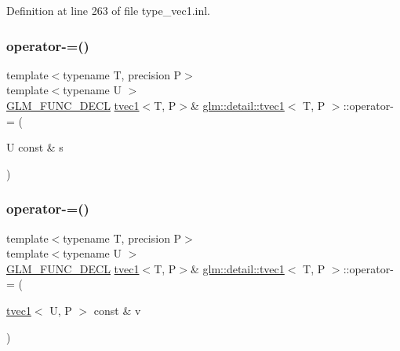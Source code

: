 Definition at line 263 of file type\+\_\+vec1.\+inl.

\mbox{\label{structglm_1_1detail_1_1tvec1_affba0ab0b93fbaa98d843c89433606f3}} 
\subsubsection{\texorpdfstring{operator-\/=()}{operator-=()}\hspace{0.1cm}{\footnotesize\ttfamily [1/4]}}
{\footnotesize\ttfamily template$<$typename T, precision P$>$ \\
template$<$typename U $>$ \\
\hyperlink{setup_8hpp_ab2d052de21a70539923e9bcbf6e83a51}{G\+L\+M\+\_\+\+F\+U\+N\+C\+\_\+\+D\+E\+CL} \hyperlink{structglm_1_1detail_1_1tvec1}{tvec1}$<$T, P$>$\& \hyperlink{structglm_1_1detail_1_1tvec1}{glm\+::detail\+::tvec1}$<$ T, P $>$\+::operator-\/= (\begin{DoxyParamCaption}\item[{U const \&}]{s }\end{DoxyParamCaption})}

\mbox{\label{structglm_1_1detail_1_1tvec1_af8992bb613669f1a7aa0ff41a4fd31e3}} 
\subsubsection{\texorpdfstring{operator-\/=()}{operator-=()}\hspace{0.1cm}{\footnotesize\ttfamily [2/4]}}
{\footnotesize\ttfamily template$<$typename T, precision P$>$ \\
template$<$typename U $>$ \\
\hyperlink{setup_8hpp_ab2d052de21a70539923e9bcbf6e83a51}{G\+L\+M\+\_\+\+F\+U\+N\+C\+\_\+\+D\+E\+CL} \hyperlink{structglm_1_1detail_1_1tvec1}{tvec1}$<$T, P$>$\& \hyperlink{structglm_1_1detail_1_1tvec1}{glm\+::detail\+::tvec1}$<$ T, P $>$\+::operator-\/= (\begin{DoxyParamCaption}\item[{\hyperlink{structglm_1_1detail_1_1tvec1}{tvec1}$<$ U, P $>$ const \&}]{v }\end{DoxyParamCaption})}

